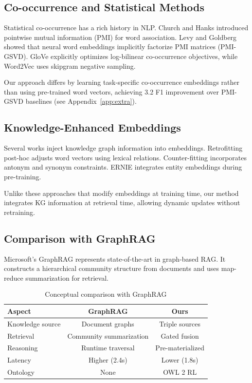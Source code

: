 \documentclass[10pt,twocolumn]{article}
\begin{document}
\subsection{Co-occurrence and Statistical Methods}
\label{sec:cooccur_related}

Statistical co-occurrence has a rich history in NLP. Church and Hanks \cite{church1990pmi} introduced pointwise mutual information (PMI) for word association. Levy and Goldberg \cite{levy2014neural} showed that neural word embeddings implicitly factorize PMI matrices (PMI-GSVD). GloVe \cite{pennington2014glove} explicitly optimizes log-bilinear co-occurrence objectives, while Word2Vec \cite{mikolov2013word2vec} uses skipgram negative sampling.

Our approach differs by learning task-specific co-occurrence embeddings rather than using pre-trained word vectors, achieving 3.2 F1 improvement over PMI-GSVD baselines (see Appendix~\ref{app:extra}).

\subsection{Knowledge-Enhanced Embeddings}
\label{sec:retrofit_related}

Several works inject knowledge graph information into embeddings. Retrofitting \cite{faruqui2015retrofitting} post-hoc adjusts word vectors using lexical relations. Counter-fitting \cite{mrksic2016counter} incorporates antonym and synonym constraints. ERNIE \cite{zhang2019ernie} integrates entity embeddings during pre-training.

Unlike these approaches that modify embeddings at training time, our method integrates KG information at retrieval time, allowing dynamic updates without retraining.

\subsection{Comparison with GraphRAG}
\label{sec:graphrag}

Microsoft's GraphRAG \cite{edge2024graphrag,microsoft2024graphrag} represents state-of-the-art in graph-based RAG. It constructs a hierarchical community structure from documents and uses map-reduce summarization for retrieval.

\begin{table}[t]
\centering
\caption{Conceptual comparison with GraphRAG}
\label{tab:graphrag_compare}
\small
\begin{tabular}{@{}lcc@{}}
\toprule
\textbf{Aspect} & \textbf{GraphRAG} & \textbf{Ours} \\
\midrule
Knowledge source & Document graphs & Triple sources \\
Retrieval & Community summarization & Gated fusion \\
Reasoning & Runtime traversal & Pre-materialized \\
Latency & Higher (2.4s) & Lower (1.8s) \\
Ontology & None & OWL 2 RL \\
\bottomrule
\end{tabular}
\end{table}
\end{document}
